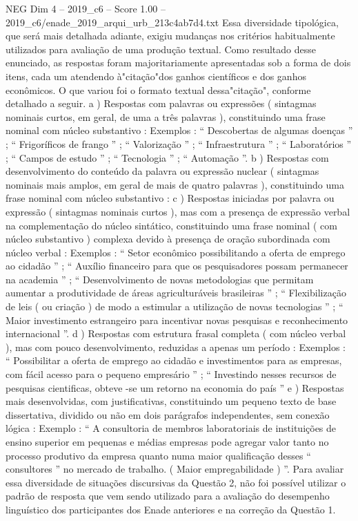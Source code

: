 \begin{textsample}{NEG Dim 4 – 2019\_c6 – Score 1.00 – 2019\_c6/enade\_2019\_arqui\_urb\_213c4ab7d4.txt}
Essa diversidade tipológica, que será mais detalhada adiante, exigiu mudanças nos critérios habitualmente utilizados para avaliação de uma produção textual.
Como resultado desse enunciado, as respostas foram majoritariamente apresentadas sob a forma de dois itens, cada um atendendo à"citação"dos ganhos científicos e dos ganhos econômicos.
O que variou foi o formato textual dessa"citação", conforme detalhado a seguir. a ) Respostas com palavras ou expressões ( sintagmas nominais curtos, em geral, de uma a três palavras ), constituindo uma frase nominal com núcleo substantivo : Exemplos : “ Descobertas de algumas doenças ” ; “ Frigoríficos de frango ” ; “ Valorização ” ; “ Infraestrutura ” ; “ Laboratórios ” ; “ Campos de estudo ” ; “ Tecnologia ” ; “ Automação ”. b ) Respostas com desenvolvimento do conteúdo da palavra ou expressão nuclear ( sintagmas nominais mais amplos, em geral de mais de quatro palavras ), constituindo uma frase nominal com núcleo substantivo : c ) Respostas iniciadas por palavra ou expressão ( sintagmas nominais curtos ), mas com a presença de expressão verbal na complementação do núcleo sintático, constituindo uma frase nominal ( com núcleo substantivo ) complexa devido à presença de oração subordinada com núcleo verbal : Exemplos : “ Setor econômico possibilitando a oferta de emprego ao cidadão ” ; “ Auxílio financeiro para que os pesquisadores possam permanecer na academia ” ; “ Desenvolvimento de novas metodologias que permitam aumentar a produtividade de áreas agriculturáveis brasileiras ” ; “ Flexibilização de leis ( ou criação ) de modo a estimular a utilização de novas tecnologias ” ; “ Maior investimento estrangeiro para incentivar novas pesquisas e reconhecimento internacional ”. d ) Respostas com estrutura frasal completa ( com núcleo verbal ), mas com pouco desenvolvimento, reduzidas a apenas um período : Exemplos : “ Possibilitar a oferta de emprego ao cidadão e investimentos para as empresas, com fácil acesso para o pequeno empresário ” ; “ Investindo nesses recursos de pesquisas cientificas, obteve -se um retorno na economia do país ” e ) Respostas mais desenvolvidas, com justificativas, constituindo um pequeno texto de base dissertativa, dividido ou não em dois parágrafos independentes, sem conexão lógica : Exemplo : “ A consultoria de membros laboratoriais de instituições de ensino superior em pequenas e médias empresas pode agregar valor tanto no processo produtivo da empresa quanto numa maior qualificação desses “ consultores ” no mercado de trabalho. ( Maior empregabilidade ) ”.
Para avaliar essa diversidade de situações discursivas da Questão 2, não foi possível utilizar o padrão de resposta que vem sendo utilizado para a avaliação do desempenho linguístico dos participantes dos Enade anteriores e na correção da Questão 1.

\end{textsample}
